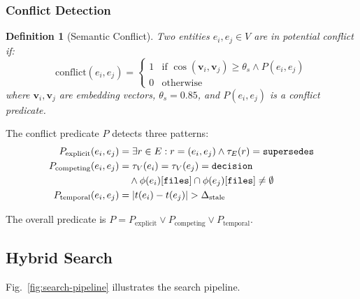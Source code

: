 \documentclass[10pt,journal,compsoc]{IEEEtran}
\newtheorem{definition}{Definition}
\begin{document}
\subsubsection{Conflict Detection}

\begin{definition}[Semantic Conflict]
Two entities $e_i, e_j \in V$ are in potential conflict if:
\begin{equation}
\text{conflict}(e_i, e_j) = \begin{cases}
1 & \text{if } \cos(\mathbf{v}_i, \mathbf{v}_j) \geq \theta_s \land P(e_i, e_j) \\
0 & \text{otherwise}
\end{cases}
\end{equation}
where $\mathbf{v}_i, \mathbf{v}_j$ are embedding vectors, $\theta_s = 0.85$, and $P(e_i, e_j)$ is a conflict predicate.
\end{definition}

The conflict predicate $P$ detects three patterns:
\begin{align}
P_{\text{explicit}}(e_i, e_j) &= \exists r \in E: r = (e_i, e_j) \land \tau_E(r) = \texttt{supersedes} \\
P_{\text{competing}}(e_i, e_j) &= \tau_V(e_i) = \tau_V(e_j) = \texttt{decision} \notag \\
&\quad \land \phi(e_i)[\texttt{files}] \cap \phi(e_j)[\texttt{files}] \neq \emptyset \\
P_{\text{temporal}}(e_i, e_j) &= |t(e_i) - t(e_j)| > \Delta_{\text{stale}}
\end{align}

The overall predicate is $P = P_{\text{explicit}} \lor P_{\text{competing}} \lor P_{\text{temporal}}$.

\subsection{Hybrid Search}

Fig.~\ref{fig:search-pipeline} illustrates the search pipeline.
\end{document}
